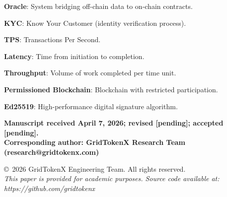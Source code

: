 \documentclass[conference]{IEEEtran}
\begin{document}
\textbf{Oracle}: System bridging off-chain data to on-chain contracts.

\textbf{KYC}: Know Your Customer (identity verification process).

\textbf{TPS}: Transactions Per Second.

\textbf{Latency}: Time from initiation to completion.

\textbf{Throughput}: Volume of work completed per time unit.

\textbf{Permissioned Blockchain}: Blockchain with restricted participation.

\textbf{Ed25519}: High-performance digital signature algorithm.

\vspace{12pt}
\noindent\textbf{Manuscript received April 7, 2026; revised [pending]; accepted [pending].}\\
\textbf{Corresponding author: GridTokenX Research Team (research@gridtokenx.com)}

\vspace{6pt}
\noindent\copyright\ 2026 GridTokenX Engineering Team. All rights reserved.\\
\textit{This paper is provided for academic purposes. Source code available at: https://github.com/gridtokenx}
\end{document}
